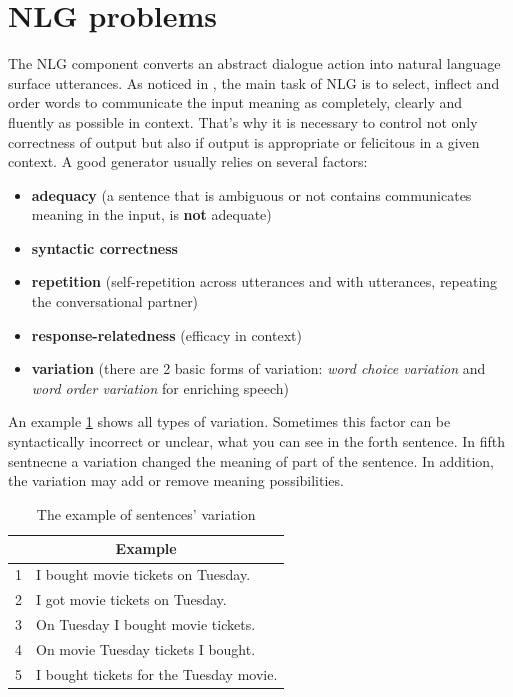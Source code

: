 \section{NLG problems}
The NLG component converts an abstract dialogue action into natural language surface utterances. As noticed in \cite{generator_problems}, the main task of NLG is to select, inflect and order words to communicate the input meaning as completely, clearly and fluently as possible in context. That's why it is necessary to control not only correctness of output but also if output is appropriate or felicitous in a given context. A good generator usually relies on several factors:
\begin{itemize}
  \item \textbf{adequacy} (a sentence that is ambiguous or not contains communicates meaning in the input, is \textbf{not} adequate)  
  \item \textbf{syntactic correctness} 
  \item \textbf{repetition} (self-repetition across utterances and with utterances, repeating the conversational partner)
  \item \textbf{response-relatedness} (efficacy in context)
  \item \textbf{variation} (there are 2 basic forms of variation: \textit{word choice variation} and \textit{word order variation} for enriching speech)
\end{itemize}
An example \ref{tab:var_example} shows all types of variation. Sometimes this factor can be syntactically incorrect or unclear, what you can see in the forth sentence. In fifth sentnecne a variation changed the meaning of part of the sentence. In addition, the variation may add or remove meaning possibilities.

\begin{table}[t]
\centering
 \begin{tabular}{|p{0.5cm}|p{8cm}|} 
 \hline
 \multicolumn{2}{|c|}{Example} \\
 \hline
 1 & I bought movie tickets on Tuesday. \\ 
 \hline
 2 & I got movie tickets on Tuesday. \\
 \hline
 3 & On Tuesday I bought movie tickets. \\
 \hline
 4 & On movie Tuesday tickets I bought. \\
 \hline
 5 & I bought tickets for the Tuesday movie. \\ 
 \hline
 \end{tabular}
 \caption{The example of sentences' variation}
\label{tab:var_example}
\end{table}

